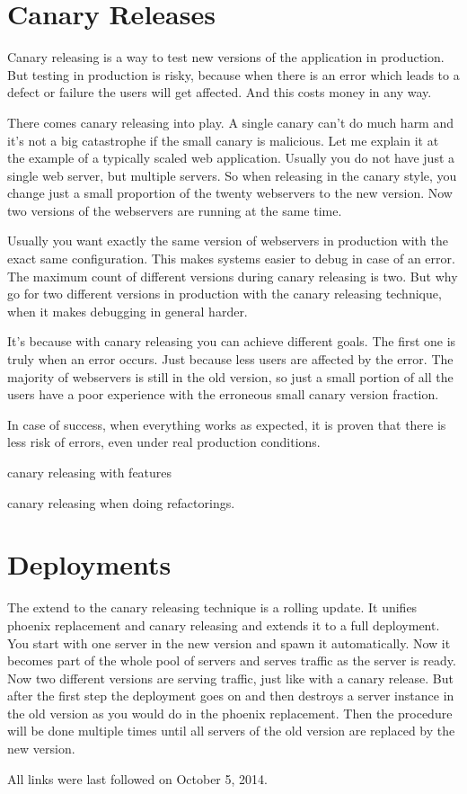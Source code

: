 \documentclass[runningheads,a4paper]{llncs}
\begin{document}
\section{Canary Releases}

Canary releasing is a way to test new versions of the application in
production. But testing in production is risky, because when there is
an error which leads to a defect or failure the users will get
affected. And this costs money in any way.

There comes canary releasing into play. A single canary can't do much
harm and it's not a big catastrophe if the small canary is
malicious. Let me explain it at the example of a typically scaled web
application. Usually you do not have just a single web server, but
multiple servers. So when releasing in the canary style, you change
just a small proportion of the twenty webservers to the new
version. Now two versions of the webservers are running at the same
time.

Usually you want exactly the same version of webservers in production
with the exact same configuration. This makes systems easier to debug
in case of an error. The maximum count of different versions during
canary releasing is two. But why go for two different versions in
production with the canary releasing technique, when it makes
debugging in general harder.

It's because with canary releasing you can achieve different
goals. The first one is truly when an error occurs. Just because less
users are affected by the error. The majority of webservers is still
in the old version, so just a small portion of all the users have a
poor experience with the erroneous small canary version fraction.

In case of success, when everything works as expected, it is proven
that there is less risk of errors, even under real production
conditions.

canary releasing with features

canary releasing when doing refactorings.

\section{Deployments}

The extend to the canary releasing technique is a rolling update. It
unifies phoenix replacement and canary releasing and extends it to a
full deployment. You start with one server in the new version and
spawn it automatically. Now it becomes part of the whole pool of
servers and serves traffic as the server is ready. Now two different
versions are serving traffic, just like with a canary release. But
after the first step the deployment goes on and then destroys a server
instance in the old version as you would do in the phoenix
replacement. Then the procedure will be done multiple times until all
servers of the old version are replaced by the new version.




All links were last followed on October 5, 2014.
\end{document}
